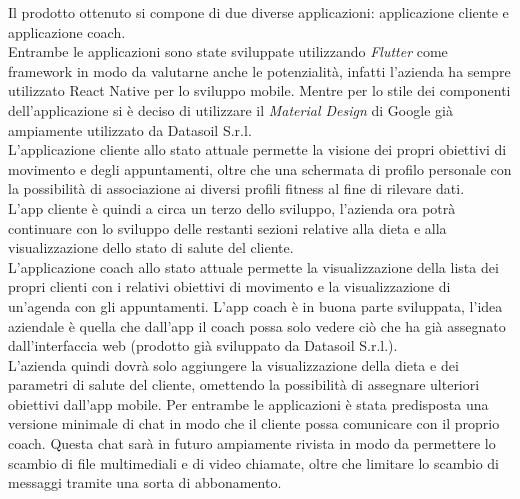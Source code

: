 Il prodotto ottenuto si compone di due diverse applicazioni: applicazione cliente e applicazione coach.\\
Entrambe le applicazioni sono state sviluppate utilizzando \textit{Flutter} come framework in modo da valutarne anche le potenzialità, infatti l'azienda ha sempre utilizzato React Native per lo sviluppo mobile. Mentre per lo stile dei componenti dell'applicazione si è deciso di utilizzare il \textit{Material Design} di Google già ampiamente utilizzato da Datasoil S.r.l.\\
L'applicazione cliente allo stato attuale permette la visione dei propri obiettivi di movimento e degli appuntamenti, oltre che una schermata di profilo personale con la possibilità di associazione ai diversi profili fitness al fine di rilevare dati.\\
L'app cliente è quindi a circa un terzo dello sviluppo, l'azienda ora potrà continuare con lo sviluppo delle restanti sezioni relative alla dieta e alla visualizzazione dello stato di salute del cliente. \\
L'applicazione coach allo stato attuale permette la visualizzazione della lista dei propri clienti con i relativi obiettivi di movimento e la visualizzazione di un'agenda con gli appuntamenti. L'app coach è in buona parte sviluppata, l'idea aziendale è quella che dall'app il coach possa solo vedere ciò che ha già assegnato dall'interfaccia web (prodotto già sviluppato da Datasoil S.r.l.). \\
L'azienda quindi dovrà solo aggiungere la visualizzazione della dieta e dei parametri di salute del cliente, omettendo la possibilità di assegnare ulteriori obiettivi dall'app mobile. 
Per entrambe le applicazioni è stata predisposta una versione minimale di chat in modo che il cliente possa comunicare con il proprio coach. Questa chat sarà in futuro ampiamente rivista in modo da permettere lo scambio di file multimediali e di video chiamate, oltre che limitare lo scambio di messaggi tramite una sorta di abbonamento.
